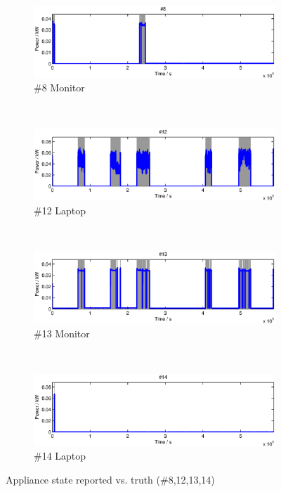 \begin{figure}[p]
    \centering
    \begin{subfigure}[t]{0.8\textwidth}
        \centering
        \includegraphics[width=\textwidth] {../../sw/pc/matlab/disagg-result/state-8.eps}
        \caption{\#8 Monitor}
    \end{subfigure} 
    \\
    \begin{subfigure}[t]{0.8\textwidth}
        \centering
        \includegraphics[width=\textwidth] {../../sw/pc/matlab/disagg-result/state-12.eps}
        \caption{\#12 Laptop}
    \end{subfigure}
    \\
    \begin{subfigure}[t]{0.8\textwidth}
        \centering
        \includegraphics[width=\textwidth] {../../sw/pc/matlab/disagg-result/state-13.eps}
        \caption{\#13 Monitor}
    \end{subfigure}
    \\
    \begin{subfigure}[t]{0.8\textwidth}
        \centering
        \includegraphics[width=\textwidth] {../../sw/pc/matlab/disagg-result/state-14.eps}
        \caption{\#14 Laptop}
    \end{subfigure}
    \caption{Appliance state reported vs. truth (\#8,12,13,14)}\label{fig:state-8-12-13-14}
\end{figure}

